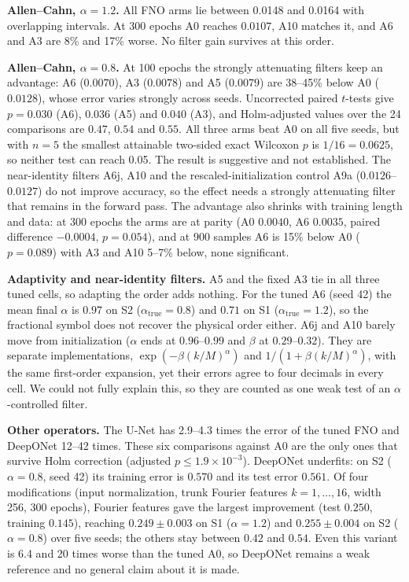 \documentclass[conference]{IEEEtran}
\begin{document}
\textbf{Allen--Cahn, $\alpha=1.2$.} All FNO arms lie between 0.0148 and 0.0164 with overlapping intervals. At 300 epochs A0 reaches $0.0107$, A10 matches it, and A6 and A3 are 8\% and 17\% worse. No filter gain survives at this order.

\textbf{Allen--Cahn, $\alpha=0.8$.} At 100 epochs the strongly attenuating filters keep an advantage: A6 ($0.0070$), A3 ($0.0078$) and A5 ($0.0079$) are 38--45\% below A0 ($0.0128$), whose error varies strongly across seeds. Uncorrected paired $t$-tests give $p=0.030$ (A6), $0.036$ (A5) and $0.040$ (A3), and Holm-adjusted values over the 24 comparisons are $0.47$, $0.54$ and $0.55$. All three arms beat A0 on all five seeds, but with $n=5$ the smallest attainable two-sided exact Wilcoxon $p$ is $1/16=0.0625$, so neither test can reach 0.05. The result is suggestive and not established. The near-identity filters A6j, A10 and the rescaled-initialization control A9a ($0.0126$--$0.0127$) do not improve accuracy, so the effect needs a strongly attenuating filter that remains in the forward pass. The advantage also shrinks with training length and data: at 300 epochs the arms are at parity (A0 $0.0040$, A6 $0.0035$, paired difference $-0.0004$, $p=0.054$), and at 900 samples A6 is 15\% below A0 ($p=0.089$) with A3 and A10 5--7\% below, none significant.

\textbf{Adaptivity and near-identity filters.} A5 and the fixed A3 tie in all three tuned cells, so adapting the order adds nothing. For the tuned A6 (seed 42) the mean final $\alpha$ is $0.97$ on S2 ($\alpha_{\mathrm{true}}=0.8$) and $0.71$ on S1 ($\alpha_{\mathrm{true}}=1.2$), so the fractional symbol does not recover the physical order either. A6j and A10 barely move from initialization ($\alpha$ ends at $0.96$--$0.99$ and $\beta$ at $0.29$--$0.32$). They are separate implementations, $\exp(-\beta(k/M)^{\alpha})$ and $1/(1+\beta(k/M)^{\alpha})$, with the same first-order expansion, yet their errors agree to four decimals in every cell. We could not fully explain this, so they are counted as one weak test of an $\alpha$-controlled filter.

\textbf{Other operators.} The U-Net has 2.9--4.3 times the error of the tuned FNO and DeepONet 12--42 times. These six comparisons against A0 are the only ones that survive Holm correction (adjusted $p\le1.9\times10^{-3}$). DeepONet underfits: on S2 ($\alpha=0.8$, seed 42) its training error is $0.570$ and its test error $0.561$. Of four modifications (input normalization, trunk Fourier features $k=1,\dots,16$, width 256, 300 epochs), Fourier features gave the largest improvement (test $0.250$, training $0.145$), reaching $0.249\pm0.003$ on S1 ($\alpha=1.2$) and $0.255\pm0.004$ on S2 ($\alpha=0.8$) over five seeds; the others stay between $0.42$ and $0.54$. Even this variant is 6.4 and 20 times worse than the tuned A0, so DeepONet remains a weak reference and no general claim about it is made.
\end{document}
